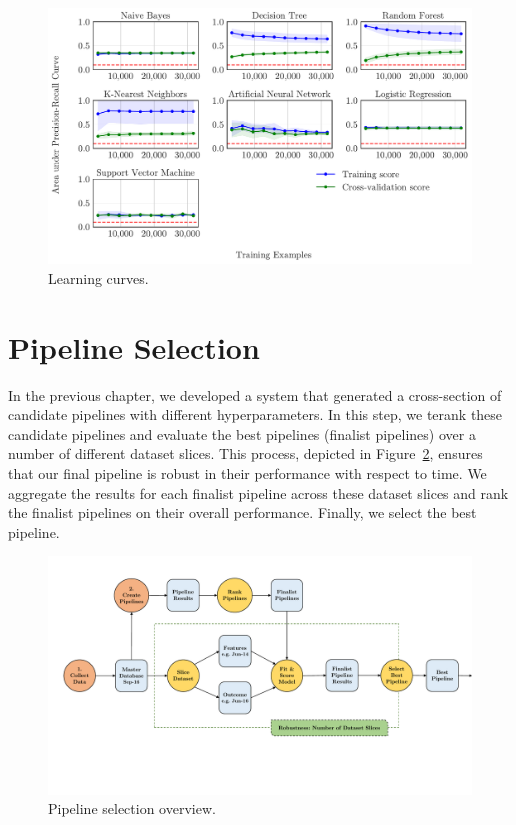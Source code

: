\documentclass[../thesis/thesis.tex]{subfiles}
\begin{document}
\begin{figure}[!htb]
    \centering
    \includegraphics[width=\textwidth]{../figures/design/create_learning_curves}
    \caption[Learning curves by classification algorithms]{Learning curves.}
    \label{fig:design:create_learning_curves}
\end{figure}

\section{Pipeline Selection}

In the previous chapter, we developed a system that generated a cross-section of candidate pipelines with different hyperparameters. In this step, we terank these candidate pipelines and evaluate the best pipelines (finalist pipelines) over a number of different dataset slices. This process, depicted in Figure~\ref{fig:evaluation:pipeline_selection}, ensures that our final pipeline is robust in their performance with respect to time. We aggregate the results for each finalist pipeline across these dataset slices and rank the finalist pipelines on their overall performance. Finally, we select the best pipeline.

\begin{figure}[!htb]
    \centering
    \includegraphics[width=\textwidth]{../figures/evaluation/pipeline_selection}
    \caption[Pipeline selection flowchart]{Pipeline selection overview.}
    \label{fig:evaluation:pipeline_selection}
\end{figure}
\end{document}

